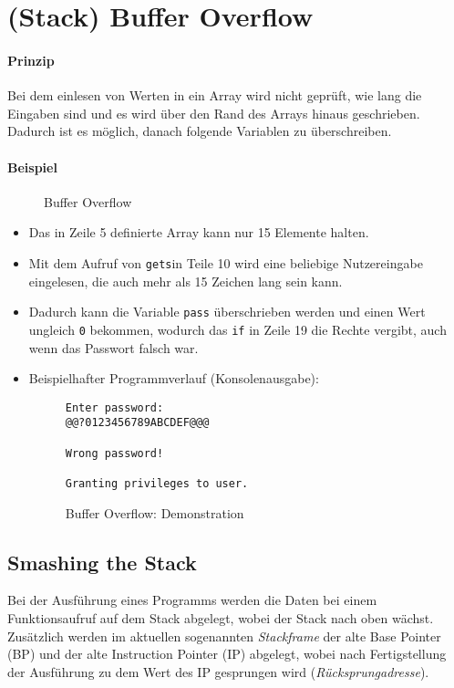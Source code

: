 	\section{(Stack) Buffer Overflow}
		\paragraph{Prinzip}
			Bei dem einlesen von Werten in ein Array wird nicht geprüft, wie lang die Eingaben sind und es wird über den Rand des Arrays hinaus geschrieben. Dadurch ist es möglich, danach folgende Variablen zu überschreiben.

		\paragraph{Beispiel}
			\begin{figure}[H]
				\centering
				
				\caption{Buffer Overflow}
			\end{figure}
			\begin{itemize}
				\item Das in Zeile 5 definierte Array kann nur 15 Elemente halten.
				\item Mit dem Aufruf von \texttt{gets}in Teile 10 wird eine beliebige Nutzereingabe eingelesen, die auch mehr als 15 Zeichen lang sein kann.
				\item Dadurch kann die Variable \texttt{pass} überschrieben werden und einen Wert ungleich \texttt{0} bekommen, wodurch das \texttt{if} in Zeile 19 die Rechte vergibt, auch wenn das Passwort falsch war.
				\item Beispielhafter Programmverlauf (Konsolenausgabe):
					\begin{figure}[H]
						\centering
						\begin{lstlisting}[numbers = none]
Enter password:
@@?0123456789ABCDEF@@@

Wrong password!

Granting privileges to user.
\end{lstlisting}
						\caption{Buffer Overflow: Demonstration}
					\end{figure}
			\end{itemize}

		\subsection{Smashing the Stack}
			Bei der Ausführung eines Programms werden die Daten bei einem Funktionsaufruf auf dem Stack abgelegt, wobei der Stack nach oben wächst. Zusätzlich werden im aktuellen sogenannten \textit{Stackframe} der alte Base Pointer (BP) und der alte Instruction Pointer (IP) abgelegt, wobei nach Fertigstellung der Ausführung zu dem Wert des IP gesprungen wird (\textit{Rücksprungadresse}).

